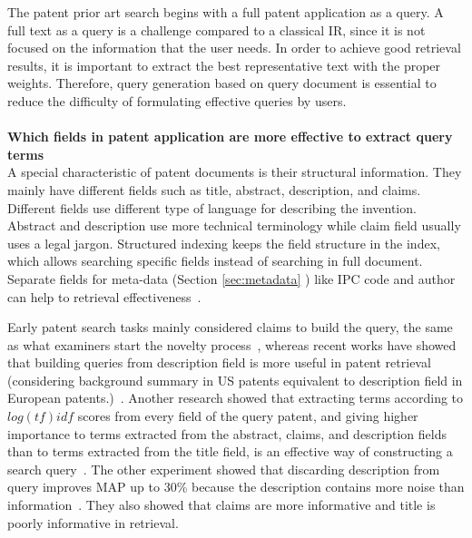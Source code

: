 The patent prior art search begins with a full patent application as a query. A full text as a query is a challenge compared to a classical IR, since it is not focused on the information that the user needs. In order to achieve good retrieval results, it is important to extract the best representative text with the proper weights. Therefore, query generation based on query document is essential to reduce the difficulty of formulating effective queries by users. 
\\\\
\textbf{Which fields in patent application are more effective to extract query terms}
\ \\
A special characteristic of patent documents is their structural information. They mainly have different fields such as title, abstract, description, and claims. Different fields use different type of language for describing the invention. Abstract and description use more technical terminology while claim field usually uses a legal jargon. Structured indexing keeps the field structure in the index, which allows searching specific fields instead of searching in full document. Separate fields for meta-data (Section \ref{sec:metadata} ) like IPC code and author can help to retrieval effectiveness~\citep{magdy2010exploring}. 

Early patent search tasks mainly considered claims to build the query, the same as what examiners start the novelty process~\citep{konishi2005query, takaki2004associative, mase2005proposal, fujii2007enhancing}, whereas recent works have showed that building queries from description field is more useful in patent retrieval (considering background summary in US patents equivalent to description field in European patents.)~\citep{xue2009transforming, xue2009automatic, mahdabi2011building}. Another research showed that extracting terms according to $ log(tf)idf $ scores from every field of the query patent, and giving higher importance to terms extracted from the abstract, claims, and description fields than to terms extracted from the title field, is an effective way of constructing a search query~\citep{cetintas2012effective}. The other experiment showed that discarding description from query improves MAP up to 30\% because the description contains more noise than information~\citep{gobeill2010simple}. They also showed that claims are more informative and title is poorly informative in retrieval.   


